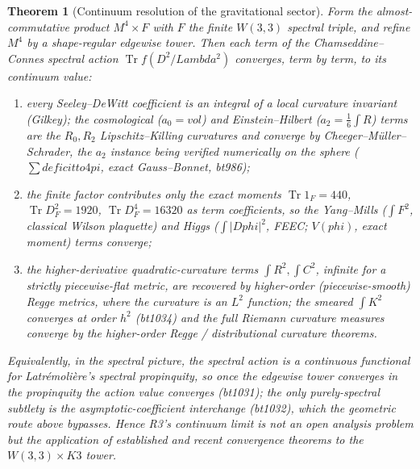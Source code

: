 \documentclass[12pt,a4paper]{article}
\def\mathrm#1{#1}%
\def\texttt#1{#1}%
\def\Lambda{Lambda}%
\def\phi{phi}%
\def\pi{pi}%
\def\to{ to }%
\newtheorem{theorem}{Theorem}[section]
\theoremstyle{definition}
\begin{document}
\begin{theorem}[Continuum resolution of the gravitational sector]
\label{thm:r3-continuum-resolution}
Form the almost-commutative product $M^4\times F$ with $F$ the finite $W(3,3)$
spectral triple, and refine $M^4$ by a shape-regular \emph{edgewise} tower.
Then each term of the Chamseddine--Connes spectral action
$\operatorname{Tr}f(D^2/\Lambda^2)$ converges, term by term, to its continuum
value:
\begin{enumerate}[label=\textup{(\roman*)}]
  \item every Seeley--DeWitt coefficient is an integral of a local curvature
        invariant \textup{(Gilkey)}; the cosmological ($a_0=\mathrm{vol}$) and
        Einstein--Hilbert ($a_2=\tfrac16\int R$) terms are the $R_0,R_2$
        Lipschitz--Killing curvatures and converge by Cheeger--M\"uller--Schrader,
        the $a_2$ instance being verified numerically on the sphere
        \textup{(}$\textstyle\sum\mathrm{deficit}\to4\pi$, exact Gauss--Bonnet,
        \texttt{bt986}\textup{)};
  \item the finite factor contributes only the exact moments
        $\operatorname{Tr}1_F=440$, $\operatorname{Tr}D_F^2=1920$,
        $\operatorname{Tr}D_F^4=16320$ as term coefficients, so the
        Yang--Mills ($\int F^2$, classical Wilson plaquette) and Higgs
        ($\int|D\phi|^2$, FEEC; $V(\phi)$, exact moment) terms converge;
  \item the higher-derivative quadratic-curvature terms $\int R^2,\int C^2$,
        infinite for a strictly piecewise-flat metric, are recovered by
        higher-order \textup{(}piecewise-smooth\textup{)} Regge metrics, where
        the curvature is an $L^2$ function; the smeared $\int K^2$ converges at
        order $h^2$ \textup{(}\texttt{bt1034}\textup{)} and the full Riemann
        curvature measures converge by the higher-order Regge / distributional
        curvature theorems.
\end{enumerate}
Equivalently, in the spectral picture, the spectral action is a continuous
functional for Latr\'emoli\`ere's spectral propinquity, so once the edgewise
tower converges in the propinquity the action value converges
\textup{(}\texttt{bt1031}\textup{)}; the only purely-spectral subtlety is the
asymptotic-coefficient interchange \textup{(}\texttt{bt1032}\textup{)}, which the
geometric route above bypasses. Hence R3's continuum limit is not an open
analysis problem but the \emph{application} of established and recent
convergence theorems to the $W(3,3)\times K3$ tower.
\end{theorem}
\end{document}
